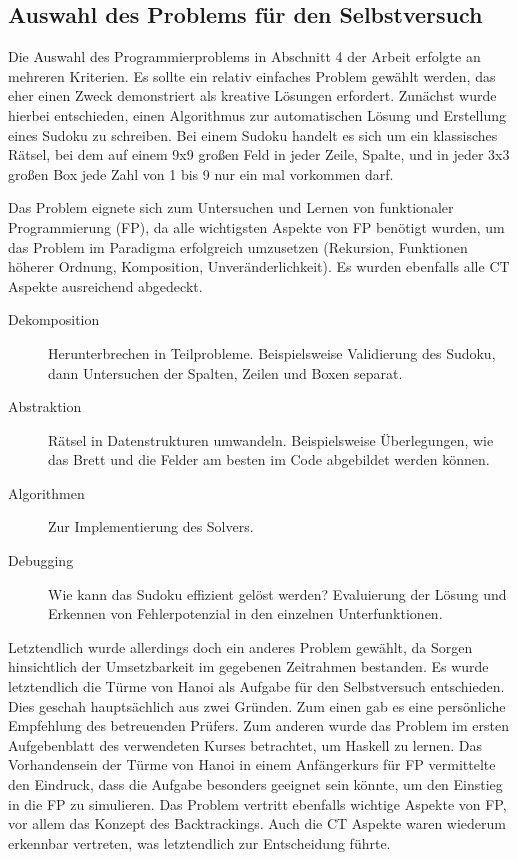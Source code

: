 \subsection{Auswahl des Problems für den Selbstversuch}\label{sec:choice_prac}
Die Auswahl des Programmierproblems in Abschnitt 4 der Arbeit erfolgte an mehreren Kriterien. Es sollte ein relativ einfaches Problem gewählt werden, das eher einen Zweck demonstriert als kreative Lösungen erfordert.
Zunächst wurde hierbei entschieden, einen Algorithmus zur automatischen Lösung und Erstellung eines Sudoku zu schreiben.
Bei einem Sudoku handelt es sich um ein klassisches Rätsel, bei dem auf einem 9x9 großen Feld in jeder Zeile, Spalte, und in jeder 3x3 großen Box jede Zahl von 1 bis 9 nur ein mal vorkommen darf.

Das Problem eignete sich zum Untersuchen und Lernen von funktionaler Programmierung (FP), da alle wichtigsten Aspekte von FP benötigt wurden, um das Problem im Paradigma erfolgreich umzusetzen (Rekursion, Funktionen höherer Ordnung, Komposition, Unveränderlichkeit). Es wurden ebenfalls alle CT Aspekte ausreichend abgedeckt.

\begin{description}
    \item[Dekomposition] Herunterbrechen in Teilprobleme. Beispielsweise Validierung des Sudoku, dann Untersuchen der Spalten, Zeilen und Boxen separat.
    \item[Abstraktion] Rätsel in Datenstrukturen umwandeln. Beispielsweise Überlegungen, wie das Brett und die Felder am besten im Code abgebildet werden können.
    \item[Algorithmen] Zur Implementierung des Solvers.
    \item[Debugging] Wie kann das Sudoku effizient gelöst werden? Evaluierung der Lösung und Erkennen von Fehlerpotenzial in den einzelnen Unterfunktionen.
\end{description}

Letztendlich wurde allerdings doch ein anderes Problem gewählt, da Sorgen hinsichtlich der Umsetzbarkeit im gegebenen Zeitrahmen bestanden.
Es wurde letztendlich die Türme von Hanoi als Aufgabe für den Selbstversuch entschieden. Dies geschah hauptsächlich aus zwei Gründen. Zum einen gab es eine persönliche Empfehlung des betreuenden Prüfers. Zum anderen wurde das Problem im ersten Aufgebenblatt des verwendeten Kurses betrachtet, um Haskell zu lernen. Das Vorhandensein der Türme von Hanoi in einem Anfängerkurs für FP vermittelte den Eindruck, dass die Aufgabe besonders geeignet sein könnte, um den Einstieg in die FP zu simulieren.
Das Problem vertritt ebenfalls wichtige Aspekte von FP, vor allem das Konzept des Backtrackings. Auch die CT Aspekte waren wiederum erkennbar vertreten, was letztendlich zur Entscheidung führte.

